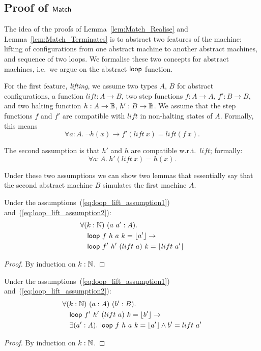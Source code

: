 \subsection{Proof of $\mathsf{Match}$}
\label{sec:match-proofs}

The idea of the proofs of Lemma~\ref{lem:Match_Realise} and Lemma~\ref{lem:Match_Terminates} is to abstract two features of the machine: lifting of
configurations from one abstract machine to another abstract machines, and sequence of two loops.  We formalise these two concepts for abstract
machines, i.e.\ we argue on the abstract $\mathsf{loop}$ function.

For the first feature, \emph{lifting}, we assume two types $A$, $B$ for abstract configurations, a function $lift : A \to B$, two step functions
$f : A \to A$, $f' : B \to B$, and two halting function $h : A \rightarrow \mathbb{B}$, $h' : B \rightarrow \mathbb{B}$.  We assume that the step functions $f$ and $f'$ are
compatible with $lift$ in non-halting states of $A$.  Formally, this means
\begin{equation}
  \label{eq:loop_lift_assumption1}
  \forall a:A.~\lnot h(x) \rightarrow f' (lift~x) = lift (f~x).
\end{equation}

The second assumption is that $h'$ and $h$ are compatible w.r.t.\ $lift$; formally:
\begin{equation}
  \label{eq:loop_lift_assumption2}
  \forall a:A.~h'(lift~x)=h(x).
\end{equation}

Under these two assumptions we can show two lemmas that essentially say that the second abstract machine $B$ simulates the first machine $A$.
\begin{lemma}
  \label{lem:loop_lift}
  Under the assumptions~(\ref{eq:loop_lift_assumption1}) and~(\ref{eq:loop_lift_assumption2}):
  \begin{alignat*}{1}
    & \forall (k:\mathbb{N})~(a~a' : A). \\
    & \quad \mathsf{loop}~f ~h ~a        ~k = \left\lfloor {a'} \right\rfloor \rightarrow \\
    & \quad \mathsf{loop}~f'~h'~(lift~a) ~k = \left\lfloor {lift~a'} \right\rfloor
  \end{alignat*}
\end{lemma}
\begin{proof}
  By induction on $k:\mathbb{N}$.
\end{proof}
\begin{lemma}
  \label{lem:loop_unlift}
  Under the assumptions~(\ref{eq:loop_lift_assumption1}) and~(\ref{eq:loop_lift_assumption2}):
  \begin{alignat*}{1}
    & \forall (k:\mathbb{N})~(a:A)~(b':B). \\
    & \quad \mathsf{loop}~f'~h'~(lift~a)~k = \left\lfloor {b'} \right\rfloor \rightarrow \\
    & \quad \exists (a':A).~\mathsf{loop}~f~h~a~k = \left\lfloor {a'} \right\rfloor \land b'=lift~a'
  \end{alignat*}
\end{lemma}
\begin{proof}
  By induction on $k:\mathbb{N}$.
\end{proof}

